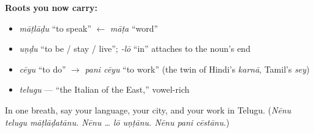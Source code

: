 \begin{cousinweb}
\textbf{Roots you now carry:}

\begin{itemize}
\raggedright
  \item \emph{māṭlāḍu} \textquotedblleft{}to speak\textquotedblright{} $\leftarrow$ \emph{māṭa} \textquotedblleft{}word\textquotedblright{}
  \item \emph{uṇḍu} \textquotedblleft{}to be / stay / live\textquotedblright{}; \emph{-lō} \textquotedblleft{}in\textquotedblright{} attaches to the noun's end
  \item \emph{cēyu} \textquotedblleft{}to do\textquotedblright{} $\to$ \emph{pani cēyu} \textquotedblleft{}to work\textquotedblright{} (the twin of Hindi's \emph{karnā}, Tamil's \emph{sey})
  \item \emph{telugu} — \textquotedblleft{}the Italian of the East,\textquotedblright{} vowel-rich
\end{itemize}
\end{cousinweb}

\begin{tcolorbox}[breakable,colback=teal!4,colframe=teal!35!black,title={Before you move on}]
In one breath, say your language, your city, and your work in Telugu. (\emph{Nēnu telugu māṭlāḍatānu. Nēnu … lō uṇṭānu. Nēnu pani cēstānu.})
\end{tcolorbox}
